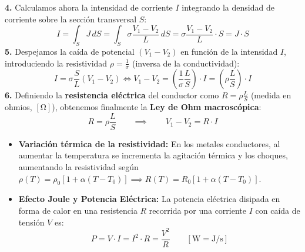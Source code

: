 \begin{ejercicio}
\textbf{4.} Calculamos ahora la intensidad de corriente $I$ integrando la densidad de corriente sobre la sección transversal $S$:
\begin{equation}
    I = \int_S J\, dS = \int_S \sigma \frac{V_1 - V_2}{L}\, dS = \sigma \frac{V_1 - V_2}{L} \cdot S = J \cdot S
\end{equation}
\textbf{5.} Despejamos la caída de potencial $(V_1 - V_2)$ en función de la intensidad $I$, introduciendo la resistividad $\rho = \frac{1}{\sigma}$ (inversa de la conductividad):
\begin{equation}
    I = \sigma \frac{S}{L} (V_1 - V_2) \iff V_1 - V_2 = \left(\frac{1}{\sigma} \frac{L}{S}\right) \cdot I = \left(\rho \frac{L}{S}\right) \cdot I
\end{equation}
\textbf{6.} Definiendo la \textbf{resistencia eléctrica} del conductor como $R = \rho \frac{L}{S}$ (medida en ohmios, $[\si{\ohm}]$), obtenemos finalmente la \textbf{Ley de Ohm macroscópica}:
\begin{equation}
    \boxed{R = \rho \frac{L}{S} \qquad \implies \qquad V_1 - V_2 = R \cdot I}
\end{equation}
\end{ejercicio}

\begin{aviso}
\begin{itemize}[leftmargin=*]
    \item \textbf{Variación térmica de la resistividad:} En los metales conductores, al aumentar la temperatura se incrementa la agitación térmica y los choques, aumentando la resistividad según $\rho(T) = \rho_0 [1 + \alpha(T - T_0)] \implies R(T) = R_0 [1 + \alpha(T - T_0)]$.
    \item \textbf{Efecto Joule y Potencia Eléctrica:} La potencia eléctrica disipada en forma de calor en una resistencia $R$ recorrida por una corriente $I$ con caída de tensión $V$ es:
    \begin{equation}
        P = V \cdot I = I^2 \cdot R = \frac{V^2}{R} \qquad [\si{\watt} = \si{\joule\per\second}]
    \end{equation}
\end{itemize}
\end{aviso}

